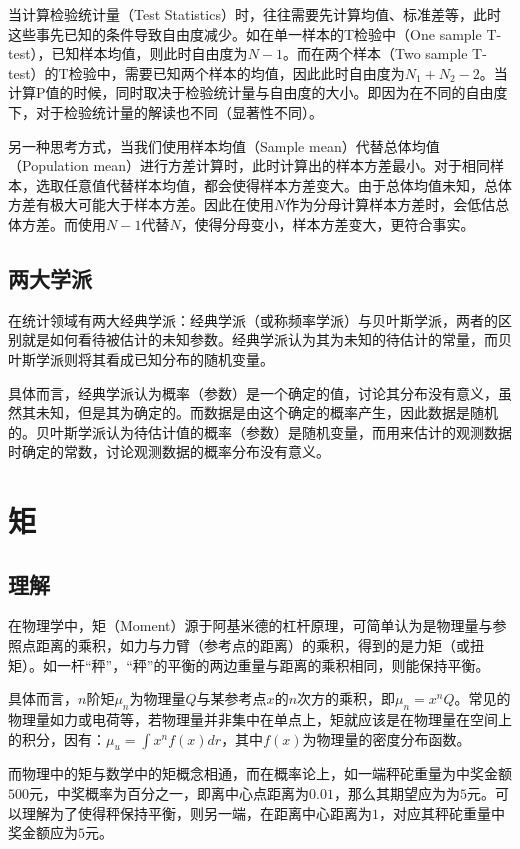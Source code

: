\documentclass[11pt]{article}
\begin{document}
当计算检验统计量（Test Statistics）时，往往需要先计算均值、标准差等，此时这些事先已知的条件导致自由度减少。如在单一样本的T检验中（One sample T-test），已知样本均值，则此时自由度为$N-1$。而在两个样本（Two sample T-test）的T检验中，需要已知两个样本的均值，因此此时自由度为$N_1 + N_2 - 2$。当计算P值的时候，同时取决于检验统计量与自由度的大小。即因为在不同的自由度下，对于检验统计量的解读也不同（显著性不同）。

另一种思考方式，当我们使用样本均值（Sample mean）代替总体均值（Population mean）进行方差计算时，此时计算出的样本方差最小。对于相同样本，选取任意值代替样本均值，都会使得样本方差变大。由于总体均值未知，总体方差有极大可能大于样本方差。因此在使用$N$作为分母计算样本方差时，会低估总体方差。而使用$N-1$代替$N$，使得分母变小，样本方差变大，更符合事实。

\subsection{两大学派}

在统计领域有两大经典学派：经典学派（或称频率学派）与贝叶斯学派，两者的区别就是如何看待被估计的未知参数。经典学派认为其为未知的待估计的常量，而贝叶斯学派则将其看成已知分布的随机变量。

具体而言，经典学派认为概率（参数）是一个确定的值，讨论其分布没有意义，虽然其未知，但是其为确定的。而数据是由这个确定的概率产生，因此数据是随机的。贝叶斯学派认为待估计值的概率（参数）是随机变量，而用来估计的观测数据时确定的常数，讨论观测数据的概率分布没有意义。

\section{矩}

\subsection{理解}

在物理学中，矩（Moment）源于阿基米德的杠杆原理，可简单认为是物理量与参照点距离的乘积，如力与力臂（参考点的距离）的乘积，得到的是力矩（或扭矩）。如一杆“秤”，“秤”的平衡的两边重量与距离的乘积相同，则能保持平衡。

具体而言，$n$阶矩$\mu_n$为物理量$Q$与某参考点$x$的$n$次方的乘积，即$\mu_n = x^n Q$。常见的物理量如力或电荷等，若物理量并非集中在单点上，矩就应该是在物理量在空间上的积分，因有：$\mu_u = \int x^n f(x) dr$，其中$f(x)$为物理量的密度分布函数。

而物理中的矩与数学中的矩概念相通，而在概率论上，如一端秤砣重量为中奖金额$500$元，中奖概率为百分之一，即离中心点距离为$0.01$，那么其期望应为为$5$元。可以理解为了使得秤保持平衡，则另一端，在距离中心距离为$1$，对应其秤砣重量中奖金额应为$5$元。
\end{document}
